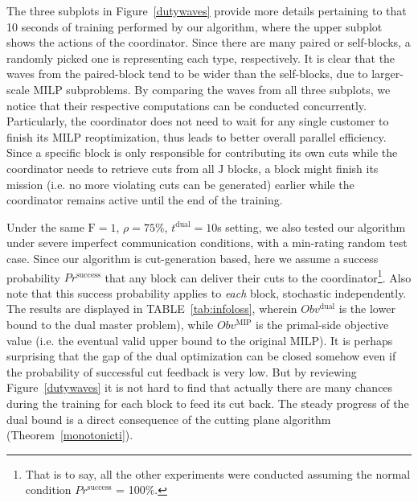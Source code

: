 \documentclass[journal]{IEEEtran}
\begin{document}
\par
The three subplots in Figure~\ref{dutywaves} provide more details pertaining to that 10 seconds of training performed by our algorithm, where the upper subplot shows the actions of the coordinator. Since there are many paired or self-blocks, a randomly picked one is representing each type, respectively.
It is clear that the waves from the paired-block tend to be wider than the self-blocks, due to larger-scale MILP subproblems.
By comparing the waves from all three subplots, we notice that their respective computations can be conducted concurrently.
Particularly, the coordinator does not need to wait for any single customer to finish its MILP reoptimization, thus leads to better overall parallel efficiency.
Since a specific block is only responsible for contributing its own cuts while the coordinator needs to retrieve cuts from all $\mathrm{J}$ blocks,
a block might finish its mission (i.e. no more violating cuts can be generated) earlier while the coordinator remains active until the end of the training.
\par
Under the same $\mathrm{F}=1$, $\rho=75\%$, $t^\textrm{dual}=10$s setting, we also tested our algorithm under severe imperfect communication conditions, with a min-rating random test case. Since our algorithm is cut-generation based, here we assume a success probability $Pr^\textrm{success}$ that any block can deliver their cuts to the coordinator\footnote{That is to say, all the other experiments were conducted assuming the normal condition $Pr^\textrm{success}$ = 100\%.}. Also note that this success probability applies to \textit{each} block, stochastic independently. The results are displayed in TABLE~\ref{tab:infoloss}, wherein $Obv^\textrm{dual}$ is the lower bound to the dual master problem), while $Obv^\textrm{MIP}$ is the primal-side objective value (i.e. the eventual valid upper bound to the original MILP). It is perhaps surprising that the gap of the dual optimization can be closed somehow even if the probability of successful cut feedback is very low. But by reviewing Figure~\ref{dutywaves} it is not hard to find that actually there are many chances during the training for each block to feed its cut back. The steady progress of the dual bound is a direct consequence of the cutting plane algorithm (Theorem~\ref{monotonicti}).
\end{document}
